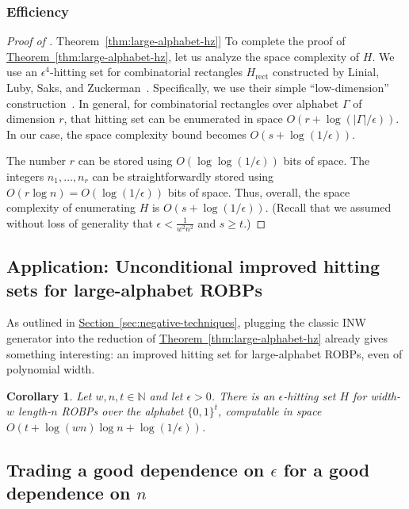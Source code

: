 \documentclass[11pt]{article}
\numberwithin{equation}{section}
\newtheorem{corollary}[theorem]{Corollary}
\theoremstyle{definition}
\theoremstyle{plain}
\newcommand{\N}{\mathbb N}
\newcommand{\expref}[2]{\hyperref[#2]{#1~\ref{#2}}}
\begin{document}
\subsubsection{Efficiency}

\begin{proof}[Proof of \expref{Theorem}{thm:large-alphabet-hz}]
To complete the proof of \expref{Theorem}{thm:large-alphabet-hz}, let us analyze the space complexity of $H$. We use an $\epsilon^4$-hitting set for combinatorial rectangles $H_{\text{rect}}$ constructed by Linial, Luby, Saks, and Zuckerman~\cite{LLSZ97}. Specifically, we use their simple ``low-dimension'' construction~\cite[Section 5]{LLSZ97}. In general, for combinatorial rectangles over alphabet $\Gamma$ of dimension $r$, that hitting set can be enumerated in space $O(r + \log(|\Gamma|/\epsilon))$. In our case, the space complexity bound becomes $O(s + \log(1/\epsilon))$.

The number $r$ can be stored using $O(\log \log(1/\epsilon))$ bits of space.
The integers $n_1, \dots, n_r$ can be straightforwardly stored using $O(r \log n) = O(\log(1/\epsilon))$ bits of space. Thus, overall, the space complexity of enumerating $H$ is $O(s + \log(1/\epsilon))$. (Recall that we assumed without loss of generality that $\epsilon < \frac{1}{w^2 n^2}$ and $s \geq t$.)
\end{proof}

\subsection{Application: Unconditional improved hitting sets for large-alphabet ROBPs}
As outlined in \expref{Section}{sec:negative-techniques}, plugging the classic INW generator \cite{INW94} into the reduction of \expref{Theorem}{thm:large-alphabet-hz} already gives something interesting: an improved hitting set for large-alphabet ROBPs, even of polynomial width.
\begin{corollary} \label{cor:large-alphabet-hz}
Let $w, n, t \in \N$ and let $\epsilon > 0$. There is an $\epsilon$-hitting set $H$ for width-$w$ length-$n$ ROBPs over the alphabet $\{0, 1\}^t$, computable in space $O(t + \log(wn) \log n + \log(1/\epsilon))$.
\end{corollary}

\subsection{Trading a good dependence on $\epsilon$ for a good dependence on $n$}
\end{document}
